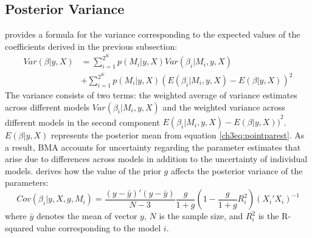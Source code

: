 \begin{refsection}
\begin{subappendices}
    \subsection*{Posterior Variance}
    \textcite{MoralBenito2012} provides a formula for the variance corresponding to the expected values of the coefficients derived in the previous subsection:
    \begin{equation}\label{ch3eq:postvar}
    \begin{aligned}
    Var(\beta \vert y, X) &= \sum_{i=1}^{2^{K}} p(M_{i} \vert y,X)Var(\beta_{i} \vert M_{i},y,X) \\ 
    & +\sum_{i=1}^{2^{K}}p(M_{i} \vert y,X){(E(\beta_{i}\vert M_{i},y,X)-E(\beta \vert y, X))}^{2}
    \end{aligned}
    \end{equation}
    The variance consists of two terms: the weighted average of variance estimates across different models $Var(\beta_{i} \vert M_{i},y,X)$ and the weighted variance across different models in the second component ${{E(\beta_{i}\vert  M_{i},y,X)}-{E(\beta \vert y,X))}}^{2}$. $E(\beta \vert y,X)$ represents the posterior mean from equation \ref{ch3eq:pointparest}. As a result, \ac{BMA} accounts for uncertainty regarding the parameter estimates that arise due to differences across models in addition to the uncertainty of individual models. \textcite{Zeugner2011} derives how the value of the prior $g$ affects the posterior variance of the parameters:
    \begin{equation}\label{ch3eq:postvarZ}
    Cov(\beta_{i}\vert y,X,g,M_{i}) = \frac{(y-\bar{y})'(y-\bar{y})}{N-3} \frac{g}{1+g} \left( 1- \frac{g}{1+g}R_{i}^{2} \right) (X_{i}'X_{i})^{-1}
    \end{equation}
    where $\bar{y}$ denotes the mean of vector $y$, $N$ is the sample size, and $R^{2}_{i}$ is the R-squared value corresponding to the model $i$.

\end{subappendices}
\end{refsection}
